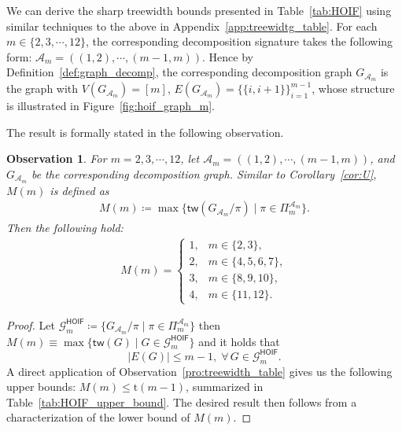 \documentclass[12pt]{article}
\theoremstyle{plain}
\newtheorem{observation}{Observation}
\theoremstyle{definition}
\newcommand{\partition}{\Pi}
\newcommand{\partitionp}[1]{\partition_{#1}}
\newcommand{\treewidthp}[1]{\mathsf{tw}(#1)}
\newcommand{\graphset}{\mathcal{G}}
\def\calA{\mathcal{A}}
\begin{document}
\begin{bibunit}[agsm]
We can derive the sharp treewidth bounds presented in Table~\ref{tab:HOIF} using similar techniques to the above in Appendix~\ref{app:treewidtg_table}. For each $m \in \{2, 3, \cdots, 12\}$, the corresponding decomposition signature takes the following form: $\calA_{m} = ((1, 2), \cdots, (m - 1, m))$. Hence by Definition~\ref{def:graph_decomp}, the corresponding decomposition graph $G_{\calA_{m}}$ is the graph with $V(G_{\calA_{m}}) = [m]$, $E(G_{\calA_{m}}) = \{ \{i, i+1\} \}_{i=1}^{m-1}$, whose structure is illustrated in Figure~\ref{fig:hoif_graph_m}.

The result is formally stated in the following observation. 
\begin{observation}
\label{obs:HOIF}    
    For $m = 2,3,\cdots, 12$, let $\calA_{m} = ((1,2),\cdots,(m-1,m))$, and $G_{\calA_m}$ be the corresponding decomposition graph. Similar to Corollary~\ref{cor:U}, $M(m)$ is defined as 
    \begin{align*}
        M(m) \coloneqq \max \{ \treewidthp{G_{\calA_m} /\pi} \mid \pi \in \partitionp{m}^{\calA_m}\}. 
    \end{align*}
    Then the following hold:
    \begin{equation}
    \label{HOIF_M}
    \begin{split}
    M (m) = \left\{ \begin{array}{ll}
    1, & m \in \{2, 3\}, \\
    2, & m \in \{4, 5, 6, 7\}, \\
    3, & m \in \{8, 9, 10\}, \\
    4, & m \in \{11, 12\}.
    \end{array} \right.
    \end{split}
    \end{equation}
\end{observation}

\begin{proof}
Let $\graphset^{\mathsf{HOIF}}_{m} \coloneqq \{ G_{\calA_m} /\pi \mid \pi \in \partitionp{m}^{\calA_m} \}$ then $M(m) \equiv \max \{ \treewidthp{G} \mid G \in \graphset^{\mathsf{HOIF}}_{m} \}$ and it holds that
\begin{equation*}
| E(G) | \leq m-1, \; \forall \, G \in \graphset^{\mathsf{HOIF}}_{m}.
\end{equation*}
A direct application of Observation~\ref{pro:treewidth_table} gives us the following upper bounds: $M(m) \le \mathrm{t}(m-1)$, summarized in Table~\ref{tab:HOIF_upper_bound}. The desired result then follows from a characterization of the lower bound of $M (m)$.


\end{proof}
\end{bibunit}
\end{document}
